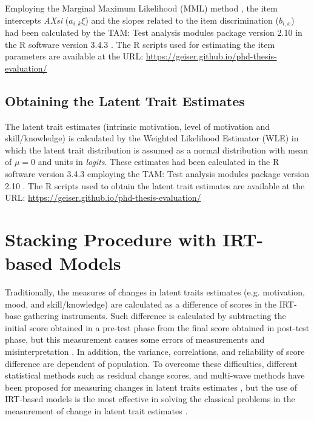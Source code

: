 Employing the Marginal Maximum Likelihood (MML) method \cite{BockAitkin1981}, the item intercepts \emph{AXsi} ($a_{i,k} \xi$) and the slopes related to the item discrimination ($b_{i,x}$) had been calculated by the TAM: Test analysis modules package version 2.10 \cite{RobitzschKieferWu2018} in the R software version 3.4.3 \cite{RCoreTeam2017}. The R scripts used for estimating the item parameters are available at the URL: \url{https://geiser.github.io/phd-thesis-evaluation/}

\subsection{Obtaining the Latent Trait Estimates}
\label{sec:obtaining-latent-trait-irt-motivation}

The latent trait estimates (intrinsic motivation, level of motivation and skill/knowledge) is calculated by the Weighted Likelihood Estimator (WLE) \cite{Warm1989} in which the latent trait distribution is assumed as a normal distribution with mean of $\mu = 0$ and units in \emph{logits}. These estimates had been calculated in the R software version 3.4.3 \cite{RCoreTeam2017} employing the TAM: Test analysis modules package version 2.10 \cite{RobitzschKieferWu2018}. The R scripts used to obtain the latent trait estimates are available at the URL: \url{https://geiser.github.io/phd-thesis-evaluation/}


\section{Stacking Procedure with IRT-based Models}
\label{sec:irt-learning-outcomes}

Traditionally, the measures of changes in latent traits estimates (e.g. motivation, mood, and skill/knowledge) are calculated as a difference of scores in the IRT-base gathering instruments. Such difference is calculated by subtracting the initial score obtained in a pre-test phase from the final score obtained in post-test phase, but this measurement causes some errors of measurements and misinterpretation \cite{Lord1956, Lord1958}. In addition, the variance, correlations, and reliability of score difference are dependent of population. To overcome these difficulties, different statistical methods such as residual change scores, and multi-wave methods have been proposed for measuring changes in latent traits estimates \cite{DimitrovRumrill2003, RogosaWillett1985}, but the use of IRT-based models is the most effective in solving the classical problems in the measurement of change in latent trait estimates \cite{GluckSpiel1997, QueirozPrimiCarvalhoEnumo2013}.

